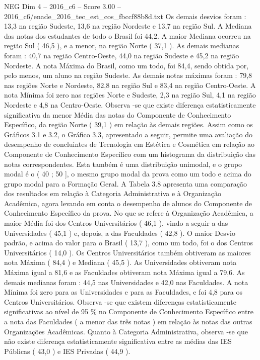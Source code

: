 \begin{textsample}{NEG Dim 4 – 2016\_c6 – Score 3.00 – 2016\_c6/enade\_2016\_tec\_est\_cos\_fbccf88b8d.txt}
Os demais desvios foram : 13,3 na região Sudeste, 13,6 na região Nordeste e 13,7 na região Sul.
A Mediana das notas dos estudantes de todo o Brasil foi 44,2.
A maior Mediana ocorreu na região Sul ( 46,5 ), e a menor, na região Norte ( 37,1 ).
As demais medianas foram : 40,7 na região Centro-Oeste, 44,0 na região Sudeste e 45,2 na região Nordeste.
A nota Máxima do Brasil, como um todo, foi 84,4, sendo obtida por, pelo menos, um aluno na região Sudeste.
As demais notas máximas foram : 79,8 nas regiões Norte e Nordeste, 82,8 na região Sul e 83,4 na região Centro-Oeste.
A nota Mínima foi zero nas regiões Norte e Sudeste, 2,3 na região Sul, 4,1 na região Nordeste e 4,8 na Centro-Oeste.
Observa -se que existe diferença estatisticamente significativa da menor Média das notas do Componente de Conhecimento Específico, da região Norte ( 39,1 ) em relação às demais regiões.
Assim como os Gráficos 3.1 e 3.2, o Gráfico 3.3, apresentado a seguir, permite uma avaliação do desempenho de concluintes de Tecnologia em Estética e Cosmética em relação ao Componente de Conhecimento Específico com um histograma da distribuição das notas correspondentes.
Esta também é uma distribuição unimodal, e o grupo modal é o ( 40 ; 50 ], o mesmo grupo modal da prova como um todo e acima do grupo modal para a Formação Geral.
A Tabela 3.8 apresenta uma comparação dos resultados em relação à Categoria Administrativa e à Organização Acadêmica, agora levando em conta o desempenho de alunos do Componente de Conhecimento Específico da prova.
No que se refere à Organização Acadêmica, a maior Média foi dos Centros Universitários ( 46,1 ), vindo a seguir a das Universidades ( 45,1 ) e, depois, a das Faculdades ( 42,8 ).
O maior Desvio padrão, e acima do valor para o Brasil ( 13,7 ), como um todo, foi o dos Centros Universitários ( 14,0 ).
Os Centros Universitários também obtiveram as maiores nota Máxima ( 84,4 ) e Mediana ( 45,5 ).
As Universidades obtiveram nota Máxima igual a 81,6 e as Faculdades obtiveram nota Máxima igual a 79,6.
As demais medianas foram : 44,5 nas Universidades e 42,0 nas Faculdades.
A nota Mínima foi zero para as Universidades e para as Faculdades, e foi 4,8 para os Centros Universitários.
Observa -se que existem diferenças estatisticamente significativas ao nível de 95 \% no Componente de Conhecimento Específico entre a nota das Faculdades ( a menor das três notas ) em relação às notas das outras Organizações Acadêmicas.
Quanto à Categoria Administrativa, observa -se que não existe diferença estatisticamente significativa entre as médias das IES Públicas ( 43,0 ) e IES Privadas ( 44,9 ).

\end{textsample}
